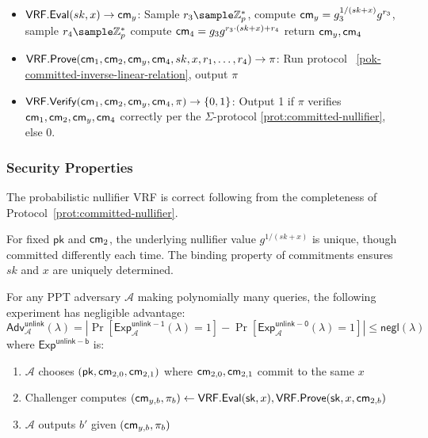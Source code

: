 \begin{itemize}
    \item $\mathsf{VRF.Eval}(sk, x) \to \mathsf{cm}_y$: Sample $r_3 \sample \Z_p^*$, compute $\mathsf{cm}_y = g_3^{1/(sk+x)}g^{r_3}$, sample $r_4 \sample \Z_p^*$ compute $\mathsf{cm}_4 = g_3g^{r_3 \cdot (sk+x) + r_4}$ return $\mathsf{cm}_y, \mathsf{cm}_4$
    
    \item $\mathsf{VRF.Prove}(\mathsf{cm}_1, \mathsf{cm}_2, \mathsf{cm}_y, \mathsf{cm}_4, sk, x, r_1, \ldots, r_4) \to \pi$: Run protocol ~\ref{pok-committed-inverse-linear-relation}, output $\pi$
    
    \item $\mathsf{VRF.Verify}(\mathsf{cm}_1, \mathsf{cm}_2, \mathsf{cm}_y, \mathsf{cm}_4, \pi) \to \{0,1\}$: Output 1 if $\pi$ verifies $\mathsf{cm}_1, \mathsf{cm}_2, \mathsf{cm}_y, \mathsf{cm}_4$ correctly per the $\Sigma$-protocol \ref{prot:committed-nullifier}, else 0.
\end{itemize}




\subsubsection{Security Properties}

\begin{theorem}[Correctness]
The probabilistic nullifier VRF is correct following from the completeness of Protocol~\ref{prot:committed-nullifier}.
\end{theorem}

\begin{theorem}[Uniqueness]
For fixed $\mathsf{pk}$ and $\mathsf{cm}_2$, the underlying nullifier value $g^{1/(sk + x)}$ is unique, though committed differently each time. The binding property of commitments ensures $sk$ and $x$ are uniquely determined.
\end{theorem}

\begin{theorem}[Unlinkability]
For any PPT adversary $\mathcal{A}$ making polynomially many queries, the following experiment has negligible advantage:
\[
\mathsf{Adv}^{\mathsf{unlink}}_{\mathcal{A}}(\lambda) = \left| \Pr[\mathsf{Exp}^{\mathsf{unlink-1}}_{\mathcal{A}}(\lambda) = 1] - \Pr[\mathsf{Exp}^{\mathsf{unlink-0}}_{\mathcal{A}}(\lambda) = 1] \right| \leq \mathsf{negl}(\lambda)
\]
where $\mathsf{Exp}^{\mathsf{unlink-b}}$ is:
\begin{enumerate}
    \item $\mathcal{A}$ chooses $(\mathsf{pk}, \mathsf{cm}_{2,0}, \mathsf{cm}_{2,1})$ where $\mathsf{cm}_{2,0}, \mathsf{cm}_{2,1}$ commit to the same $x$
    \item Challenger computes $(\mathsf{cm}_{y,b}, \pi_b) \leftarrow \mathsf{VRF.Eval}(\mathsf{sk}, x), \mathsf{VRF.Prove}(\mathsf{sk}, x, \mathsf{cm}_{2,b})$
    \item $\mathcal{A}$ outputs $b'$ given $(\mathsf{cm}_{y,b}, \pi_b)$
\end{enumerate}
\end{theorem}

